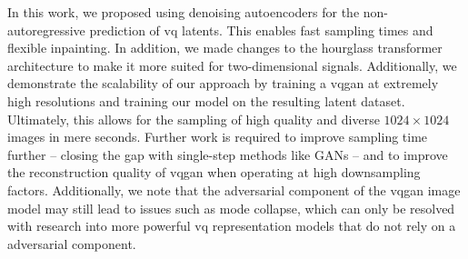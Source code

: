 
In this work, we proposed using denoising autoencoders for the
non-autoregressive prediction of \acrshort{vq} latents. This enables fast
sampling times and flexible inpainting. In addition, we made changes to the
hourglass transformer architecture to make it more suited for two-dimensional
signals. Additionally, we demonstrate the scalability of our approach by
training a \gls{vqgan} at extremely high resolutions and training our model on
the resulting latent dataset. Ultimately, this allows for the sampling of high
quality and diverse $1024 \times 1024$ images in mere seconds. Further work is
required to improve sampling time further -- closing the gap with single-step
methods like GANs -- and to improve the reconstruction quality of \gls{vqgan}
when operating at high downsampling factors. Additionally, we note that the
adversarial component of the \gls{vqgan} image model may still lead to issues
such as mode collapse, which can only be resolved with research into more
powerful \acrshort{vq} representation models that do not rely on a adversarial
component.
